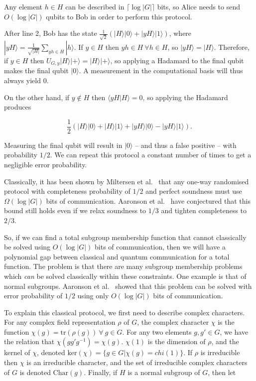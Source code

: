 \documentclass[a4paper]{article}
\begin{document}
        Any element $h \in H$ can be described in $\lceil\log |G|\rceil$ bits, so Alice needs to send $O(\log |G|)$ qubits to Bob in order to perform this protocol.

        After line 2, Bob has the state $\frac{1}{\sqrt{2}}(|H\rangle|0\rangle + |yH\rangle|1\rangle)$, where $|yH\rangle = \frac{1}{\sqrt{|H|}}\sum_{yh \in H}|h\rangle$. If $y \in H$ then $yh \in H~ \forall h \in H$, so $|yH\rangle = |H\rangle$. Therefore, if $y \in H$ then $U_{G, y}|H\rangle|+\rangle = |H\rangle|+\rangle$, so applying a Hadamard to the final qubit makes the final qubit $|0\rangle$. A measurement in the computational basis will thus always yield $0$.

        On the other hand, if $y \notin H$ then $\langle yH|H\rangle = 0$, so applying the Hadamard produces

        $$\frac{1}{2}(|H\rangle|0\rangle + |H\rangle|1\rangle + |yH\rangle|0\rangle - |yH\rangle|1\rangle).$$

        Measuring the final qubit will result in $|0\rangle$ -- and thus a false positive -- with probability $1/2$. We can repeat this protocol a constant number of times to get a negligible error probability.

        Classically, it has been shown by Miltersen et al.~\cite{Miltersen199837} that any one-way randomised protocol with completeness probability of $1/2$ and perfect soundness must use $\Omega(\log|G|)$ bits of communication. Aaronson et al.~\cite{0902.3175} have conjectured that this bound still holds even if we relax soundness to $1/3$ and tighten completeness to $2/3$.

        So, if we can find a total subgroup membership function that cannot classically be solved using $O(\log |G|)$ bits of communication, then we will have a polynomial gap between classical and quantum communication for a total function. The problem is that there are many subgroup membership problems which {\em can} be solved classically within these constraints. One example is that of normal subgroups. Aaronson et al.~\cite{0902.3175} showed that this problem can be solved with error probability of $1/2$ using only $O(\log |G|)$ bits of communication.

        To explain this classical protocol, we first need to describe complex characters. For any complex field representation $\rho$ of $G$, the complex character $\chi$ is the function $\chi(g) = \textrm{tr}(\rho(g))~\forall~g\in G$. For any two elements $g, g' \in G$, we have the relation that $\chi(gg'g^{-1}) = \chi(g)$. $\chi(1)$ is the dimension of $\rho$, and the kernel of $\chi$, denoted $\textrm{ker}(\chi) = \{g \in G|\chi(g) = chi(1)\}$. If $\rho$ is irreducible then $\chi$ is an irreducible character, and the set of irreducible complex characters of $G$ is denoted $\textrm{Char}(g)$. Finally, if $H$ is a normal subgroup of $G$, then let
\end{document}
